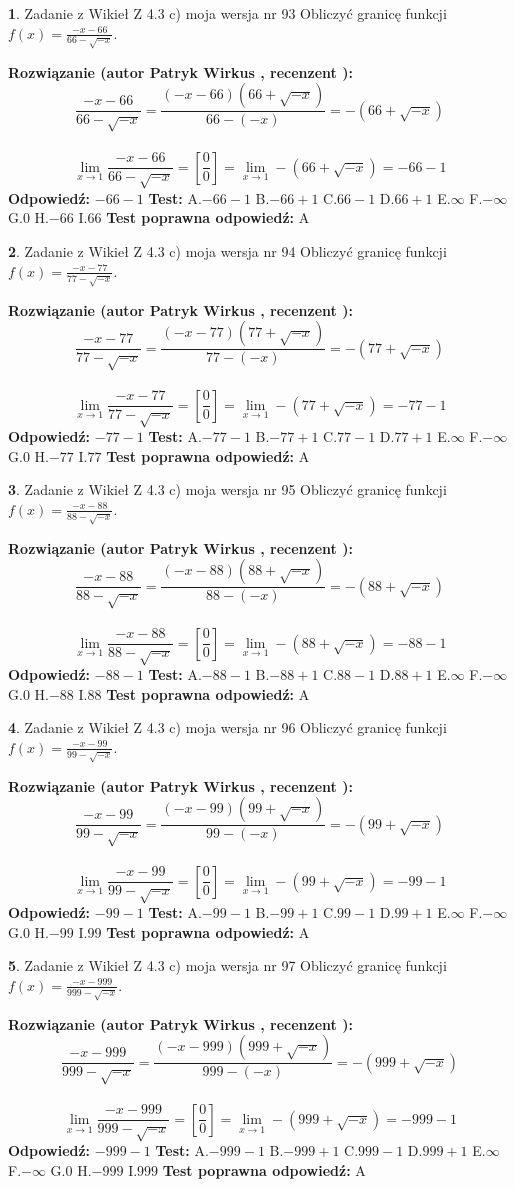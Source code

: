 \documentclass[12pt, a4paper]{article}
\theoremstyle{definition} %
\newtheorem{zad}{}
\newcommand{\zadStart}[1]{\begin{zad}#1\newline}
\newcommand{\zadStop}{\end{zad}}
\newcommand{\rozwStart}[2]{\noindent \textbf{Rozwiązanie (autor #1 , recenzent #2): }\newline}
\newcommand{\rozwStop}{\newline}
\newcommand{\odpStart}{\noindent \textbf{Odpowiedź:}\newline}
\newcommand{\odpStop}{\newline}
\newcommand{\testStart}{\noindent \textbf{Test:}\newline}
\newcommand{\testStop}{\newline}
\newcommand{\kluczStart}{\noindent \textbf{Test poprawna odpowiedź:}\newline}
\newcommand{\kluczStop}{\newline}
\begin{document}
\zadStart{Zadanie z Wikieł Z 4.3 c) moja wersja nr 93}
Obliczyć granicę funkcji $f(x)=\frac{-x-66}{66-\sqrt{-x}}$.
\zadStop
\rozwStart{Patryk Wirkus}{}
$$\frac{-x-66}{66-\sqrt{-x}}=\frac{(-x-66)(66+\sqrt{-x})}{66-(-x)}=-(66+\sqrt{-x})$$
\\
$$\lim\limits_{x\to1}\frac{-x-66}{66-\sqrt{-x}}=[\frac{0}{0}]=\lim\limits_{x\to1}-(66+\sqrt{-x}) =-66-1$$
\rozwStop
\odpStart
$-66-1$
\odpStop
\testStart
A.$-66-1$
B.$-66+1$
C.$66-1$
D.$66+1$
E.$\infty$
F.$-\infty$
G.$0$
H.$-66$
I.$66$
\testStop
\kluczStart
A
\kluczStop



\zadStart{Zadanie z Wikieł Z 4.3 c) moja wersja nr 94}
Obliczyć granicę funkcji $f(x)=\frac{-x-77}{77-\sqrt{-x}}$.
\zadStop
\rozwStart{Patryk Wirkus}{}
$$\frac{-x-77}{77-\sqrt{-x}}=\frac{(-x-77)(77+\sqrt{-x})}{77-(-x)}=-(77+\sqrt{-x})$$
\\
$$\lim\limits_{x\to1}\frac{-x-77}{77-\sqrt{-x}}=[\frac{0}{0}]=\lim\limits_{x\to1}-(77+\sqrt{-x}) =-77-1$$
\rozwStop
\odpStart
$-77-1$
\odpStop
\testStart
A.$-77-1$
B.$-77+1$
C.$77-1$
D.$77+1$
E.$\infty$
F.$-\infty$
G.$0$
H.$-77$
I.$77$
\testStop
\kluczStart
A
\kluczStop



\zadStart{Zadanie z Wikieł Z 4.3 c) moja wersja nr 95}
Obliczyć granicę funkcji $f(x)=\frac{-x-88}{88-\sqrt{-x}}$.
\zadStop
\rozwStart{Patryk Wirkus}{}
$$\frac{-x-88}{88-\sqrt{-x}}=\frac{(-x-88)(88+\sqrt{-x})}{88-(-x)}=-(88+\sqrt{-x})$$
\\
$$\lim\limits_{x\to1}\frac{-x-88}{88-\sqrt{-x}}=[\frac{0}{0}]=\lim\limits_{x\to1}-(88+\sqrt{-x}) =-88-1$$
\rozwStop
\odpStart
$-88-1$
\odpStop
\testStart
A.$-88-1$
B.$-88+1$
C.$88-1$
D.$88+1$
E.$\infty$
F.$-\infty$
G.$0$
H.$-88$
I.$88$
\testStop
\kluczStart
A
\kluczStop



\zadStart{Zadanie z Wikieł Z 4.3 c) moja wersja nr 96}
Obliczyć granicę funkcji $f(x)=\frac{-x-99}{99-\sqrt{-x}}$.
\zadStop
\rozwStart{Patryk Wirkus}{}
$$\frac{-x-99}{99-\sqrt{-x}}=\frac{(-x-99)(99+\sqrt{-x})}{99-(-x)}=-(99+\sqrt{-x})$$
\\
$$\lim\limits_{x\to1}\frac{-x-99}{99-\sqrt{-x}}=[\frac{0}{0}]=\lim\limits_{x\to1}-(99+\sqrt{-x}) =-99-1$$
\rozwStop
\odpStart
$-99-1$
\odpStop
\testStart
A.$-99-1$
B.$-99+1$
C.$99-1$
D.$99+1$
E.$\infty$
F.$-\infty$
G.$0$
H.$-99$
I.$99$
\testStop
\kluczStart
A
\kluczStop



\zadStart{Zadanie z Wikieł Z 4.3 c) moja wersja nr 97}
Obliczyć granicę funkcji $f(x)=\frac{-x-999}{999-\sqrt{-x}}$.
\zadStop
\rozwStart{Patryk Wirkus}{}
$$\frac{-x-999}{999-\sqrt{-x}}=\frac{(-x-999)(999+\sqrt{-x})}{999-(-x)}=-(999+\sqrt{-x})$$
\\
$$\lim\limits_{x\to1}\frac{-x-999}{999-\sqrt{-x}}=[\frac{0}{0}]=\lim\limits_{x\to1}-(999+\sqrt{-x}) =-999-1$$
\rozwStop
\odpStart
$-999-1$
\odpStop
\testStart
A.$-999-1$
B.$-999+1$
C.$999-1$
D.$999+1$
E.$\infty$
F.$-\infty$
G.$0$
H.$-999$
I.$999$
\testStop
\kluczStart
A
\kluczStop
\end{document}
